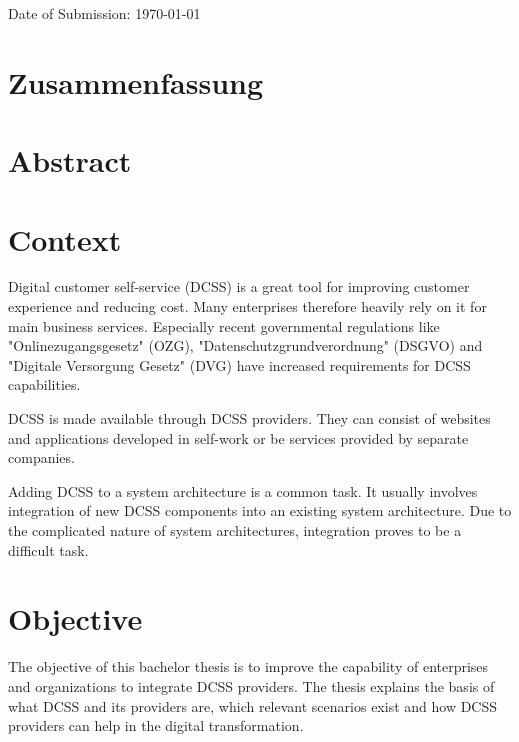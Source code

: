 \documentclass[
     12pt,         %
     a4paper,      %
     BCOR10mm,     %
     DIV14,        %
aragraph skip instad of paragraph indent
     ]{scrreprt}
\begin{document}
\medskip
\noindent
Date of Submission: \today
\newpage

\chapter*{Zusammenfassung}

\newpage

\chapter*{Abstract}

\newpage

\tableofcontents
\cleardoublepage
{}

\chapter{Context}


Digital customer self-service (DCSS) is a great tool for improving customer experience and reducing cost. Many enterprises therefore heavily
rely on it for main business services. Especially recent governmental regulations like "Onlinezugangsgesetz" (OZG), "Datenschutzgrundverordnung"
(DSGVO) and "Digitale Versorgung Gesetz" (DVG) have increased requirements for DCSS capabilities.

DCSS is made available through DCSS providers. They can consist of websites and applications developed in self-work or be 
services provided by separate companies.

Adding DCSS to a system architecture is a common task. It usually involves integration of new DCSS components
into an existing system architecture. Due to the complicated nature of system architectures, integration proves to be a difficult
task.

\chapter{Objective}


The objective of this bachelor thesis is to improve the capability of enterprises and organizations to integrate DCSS providers.
The thesis explains the basis of what DCSS and its providers are, which relevant scenarios exist and how DCSS providers can help
in the digital transformation.
\end{document}
